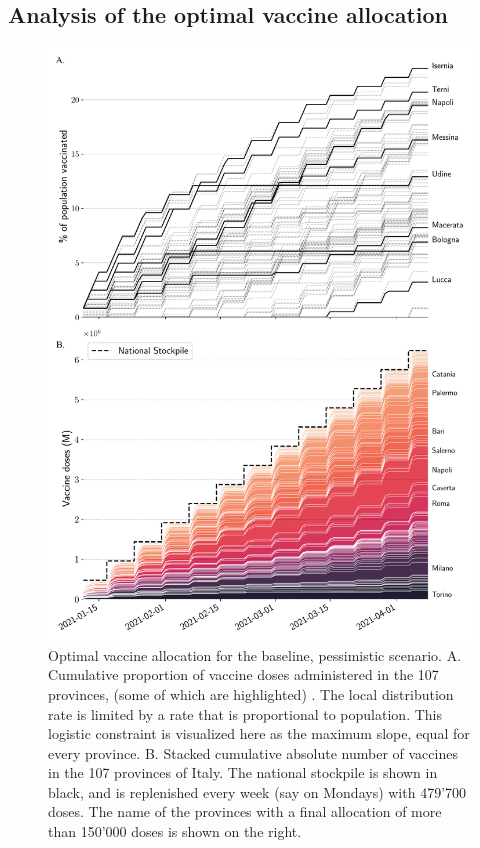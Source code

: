 \subsection*{Analysis of the optimal vaccine allocation}

\begin{figure}[!ht]
    \centering
    \includegraphics[width=\textwidth]{fig_italy-ocp/figures/ts_both.pdf}
    \caption[Optimal vaccine allocation for the baseline, pessimistic scenario. ]{Optimal vaccine allocation for the baseline, pessimistic scenario. \textsc{A.} Cumulative proportion of vaccine doses administered in the 107 provinces, (some of which are highlighted) . The local distribution rate is limited by a rate that is proportional to population. This logistic constraint is visualized here as the maximum slope, equal for every province.
    \textsc{B.} Stacked cumulative absolute number of vaccines in the 107 provinces of Italy. The national stockpile is shown in black, and is replenished every week (say on Mondays) with 479'700 doses. The name of the provinces with a final allocation of more than 150'000 doses is shown on the right.}
    \label{fig:OC_stackplot}
\end{figure}

